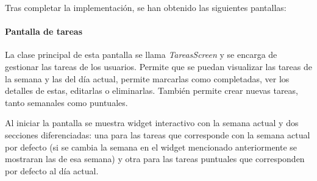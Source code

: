 Tras completar la implementación, se han obtenido las siguientes pantallas: 

\newpage 
\paragraph{Pantalla de tareas}

\parbox{\textwidth}{ 
   
}

La clase principal de esta pantalla se llama \textit{TareasScreen} y se encarga de gestionar las tareas de los usuarios. Permite que se puedan 
visualizar las tareas de la semana y las del día actual, permite marcarlas como completadas, ver los detalles de estas, editarlas o eliminarlas.
También permite crear nuevas tareas, tanto semanales como puntuales.

Al iniciar la pantalla se muestra widget interactivo con la semana actual y dos secciones diferenciadas: una para las tareas que corresponde con 
la semana actual por defecto (si se cambia la semana en el widget mencionado anteriormente se mostraran las de esa semana) y otra
para las tareas puntuales que corresponden por defecto al día actual.

